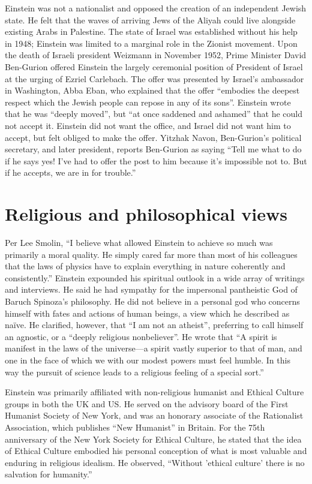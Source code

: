 \documentclass[twoside]{memoir}
\begin{document}
Einstein was not a nationalist and opposed the creation of an independent Jewish state. He felt that the waves of arriving Jews of the Aliyah could live alongside existing Arabs in Palestine. The state of Israel was established without his help in 1948; Einstein was limited to a marginal role in the Zionist movement. Upon the death of Israeli president Weizmann in November 1952, Prime Minister David Ben-Gurion offered Einstein the largely ceremonial position of President of Israel at the urging of Ezriel Carlebach. The offer was presented by Israel's ambassador in Washington, Abba Eban, who explained that the offer \enquote{embodies the deepest respect which the Jewish people can repose in any of its sons}. Einstein wrote that he was \enquote{deeply moved}, but \enquote{at once saddened and ashamed} that he could not accept it. Einstein did not want the office, and Israel did not want him to accept, but felt obliged to make the offer. Yitzhak Navon, Ben-Gurion's political secretary, and later president, reports Ben-Gurion as saying \enquote{Tell me what to do if he says yes! I've had to offer the post to him because it's impossible not to. But if he accepts, we are in for trouble.}
\section{Religious and philosophical views}
Per Lee Smolin, \enquote{I believe what allowed Einstein to achieve so much was primarily a moral quality. He simply cared far more than most of his colleagues that the laws of physics have to explain everything in nature coherently and consistently.} Einstein expounded his spiritual outlook in a wide array of writings and interviews. He said he had sympathy for the impersonal pantheistic God of Baruch Spinoza's philosophy. He did not believe in a personal god who concerns himself with fates and actions of human beings, a view which he described as naïve. He clarified, however, that \enquote{I am not an atheist}, preferring to call himself an agnostic, or a \enquote{deeply religious nonbeliever}. He wrote that \enquote{A spirit is manifest in the laws of the universe---a spirit vastly superior to that of man, and one in the face of which we with our modest powers must feel humble. In this way the pursuit of science leads to a religious feeling of a special sort.}

Einstein was primarily affiliated with non-religious humanist and Ethical Culture groups in both the UK and US. He served on the advisory board of the First Humanist Society of New York,\cite{mKToJ} and was an honorary associate of the Rationalist Association, which publishes \enquote{New Humanist} in Britain. For the 75th anniversary of the New York Society for Ethical Culture, he stated that the idea of Ethical Culture embodied his personal conception of what is most valuable and enduring in religious idealism. He observed, \enquote{Without 'ethical culture' there is no salvation for humanity.}
\end{document}
